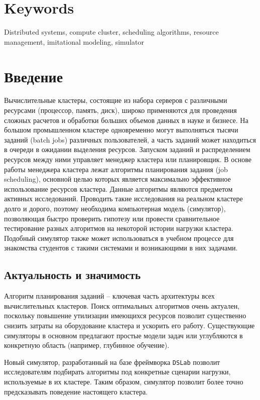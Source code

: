 {%
\section*{Keywords}
Distributed systems, compute cluster, scheduling algorithms, resource management, imitational modeling, simulator

}

\newpage 

\section{Введение}

Вычислительные кластеры, состоящие из набора серверов с различными ресурсами (процессор, память, диск), широко применяются для проведения сложных расчетов и обработки больших объемов данных в науке и бизнесе. На большом промышленном кластере одновременно могут выполняться тысячи заданий (batch jobs) различных пользователей, а часть заданий может находиться в очереди в ожидании выделения ресурсов. Запуском заданий и распределением ресурсов между ними управляет менеджер кластера или планировщик. В основе работы менеджера кластера лежат алгоритмы планирования задания (job scheduling), основной целью которых является максимально эффективное использование ресурсов кластера. Данные алгоритмы являются предметом активных исследований. Проводить такие исследования на реальном кластере долго и дорого, поэтому необходима компьютерная модель (симулятор), позволяющая быстро проверить гипотезу или провести сравнительное тестирование разных алгоритмов на некоторой истории нагрузки кластера. Подобный симулятор также может использоваться в учебном процессе для знакомства студентов с такими системами и возникающими в них задачами.

\subsection{Актуальность и значимость}

Алгоритм планирования заданий -- ключевая часть архитектуры всех вычислительных кластеров. Поиск оптимальных алгоритмов очень актуален, поскольку повышение утилизации имеющихся ресурсов позволит существенно снизить затраты на оборудование кластера и ускорить его работу. Существующие симуляторы в основном предлагают простые модели задач или углубляются в конкретную область (например, глубинное обучение). 

Новый симулятор, разработанный на базе фреймворка \texttt{DSLab} позволит исследователям подбирать алгоритмы под конкретные сценарии нагрузки, используемые в их кластере. Таким образом, симулятор позволит более точно предсказывать поведение настоящего кластера.  

